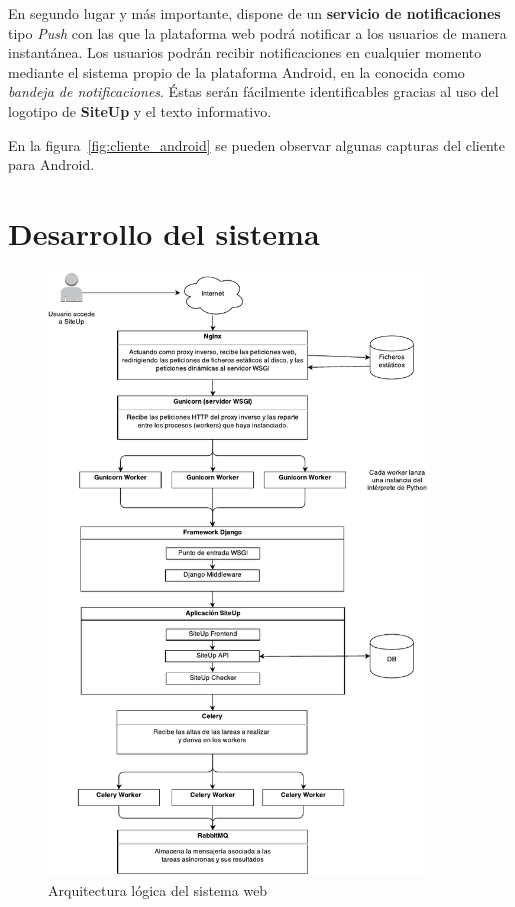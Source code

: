 \documentclass[a4paper,12pt]{article}
\begin{document}
En segundo lugar y más importante, dispone de un \textbf{servicio de
  notificaciones} tipo \textit{Push} con las que la plataforma web podrá
notificar a los usuarios de manera instantánea. Los usuarios podrán recibir
notificaciones en cualquier momento mediante el sistema propio de la plataforma
Android, en la conocida como \textit{bandeja de notificaciones}. Éstas serán
fácilmente identificables gracias al uso del logotipo de \textbf{SiteUp} y el
texto informativo.

En la figura~\ref{fig:cliente_android} se pueden observar algunas capturas del
cliente para Android. 


\section{Desarrollo del sistema}

\begin{figure}[htbp]
  \centering
  \includegraphics[width=0.9\textwidth]{diagrama_arquitectura_logica}
  \caption{Arquitectura lógica del sistema web}
  \label{fig:arquitectura-logica}
\end{figure}
\end{document}
